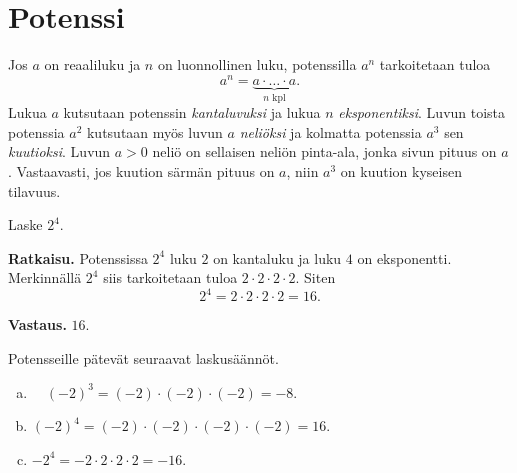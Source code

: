 \chapter{Potenssi}
    
    Jos $a$ on reaaliluku ja $n$ on luonnollinen luku, potenssilla $a^n$ tarkoitetaan tuloa
    \[
        a^n = \underbrace{a\cdot \ldots \cdot a}_{n\text{ kpl}}. 
    \]
    Lukua $a$ kutsutaan potenssin \emph{kantaluvuksi} ja lukua $n$ \emph{eksponentiksi}. Luvun toista potenssia $a^2$ kutsutaan myös luvun $a$ \emph{neliöksi} ja kolmatta potenssia $a^3$ sen \emph{kuutioksi}. Luvun $a>0$ neliö on sellaisen neliön pinta-ala, jonka sivun pituus on $a$. Vastaavasti, jos kuution särmän pituus on $a$, niin $a^3$ on kuution kyseisen tilavuus.
    
    \begin{esimerkki}
        Laske $2^4$.
        
        \textbf{Ratkaisu.}
        Potenssissa $2^4$ luku $2$ on kantaluku ja luku $4$ on eksponentti.
        Merkinnällä $2^4$ siis tarkoitetaan tuloa $2\cdot 2\cdot 2\cdot 2$. Siten
        \[
            2^4=2\cdot 2\cdot 2\cdot 2=16.
        \]
        
        \textbf{Vastaus.} $16$.
    \end{esimerkki}
    
    Potensseille pätevät seuraavat laskusäännöt.
    
    
    \begin{esimerkki}
        \begin{enumerate}[a)]
            \item $\quad (-2)^3 = (-2)\cdot (-2)\cdot (-2)           = -8$.
            \item $(-2)^4       = (-2)\cdot (-2)\cdot (-2)\cdot (-2) = 16$.
            \item $-2^4         = -2\cdot 2\cdot 2\cdot 2            = -16$.
            \end{enumerate}
    \end{esimerkki}
    
